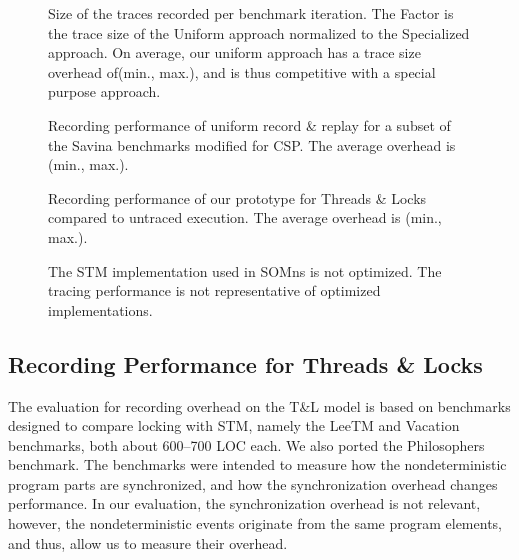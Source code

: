 \documentclass[a4paper,UKenglish,cleveref,autoref]{lipics-v2019}
\def\SOMns{SOM{\sc ns}\xspace}
\begin{document}


\begin{figure*}
	\begin{minipage}{.475\textwidth}
		\captionsetup{type=table}
		\caption{
      Size of the traces recorded per benchmark iteration.
      The Factor is the trace size of the Uniform approach
      normalized to the Specialized approach.
      On average, our uniform approach has a trace size overhead
      of\TraceAvgOverheadP (min.\TraceMinOverheadP, max.\TraceMaxOverheadP),
      and is thus competitive with a special purpose approach.
    }
		\resizebox{\textwidth}{!}{%
			\SavinaTraceDataTable}

		\label{tab:tracesize}
	\end{minipage}
	\hspace{0.05\textwidth}
	\begin{minipage}{.475\textwidth}
		\PerformanceCSP
		\vspace{-6mm}
		\caption{Recording performance of uniform record \& replay
      for a subset of the Savina benchmarks modified for CSP.
      The average overhead is\CSPAvgOverheadP
      (min.\CSPMinOverheadP, max.\CSPMaxOverheadP).}
		\label{fig:csp-perf}
		\vspace{5mm}
		\PerformanceMutex
		\vspace{-6mm}
		\caption{Recording performance of our prototype for 
      Threads \& Locks compared to untraced execution.
      The average overhead is\MutexAvgOverheadP
      (min.\MutexMinOverheadP, max.\MutexMaxOverheadP).}
		\label{fig:mutex-perf}
		\vspace{5mm}
		\PerformanceSTM
		\vspace{-6mm}
		\caption{The STM implementation used in \SOMns is not optimized.
       The tracing performance is not representative of optimized
       implementations.}
		\label{fig:stm-perf}
	\end{minipage}
\end{figure*}

\subsection{Recording Performance for Threads \& Locks}

The evaluation for recording overhead on the T\&L model is based on benchmarks
designed to compare locking with STM, namely the LeeTM and Vacation benchmarks,
both about 600--700 LOC each.
We also ported the Philosophers benchmark.
The benchmarks were intended to measure how the nondeterministic program parts
are synchronized, and how the synchronization overhead changes performance.
In our evaluation, the synchronization overhead is not relevant,
however, the nondeterministic events originate from the same program elements,
and thus, allow us to measure their overhead.
\end{document}
